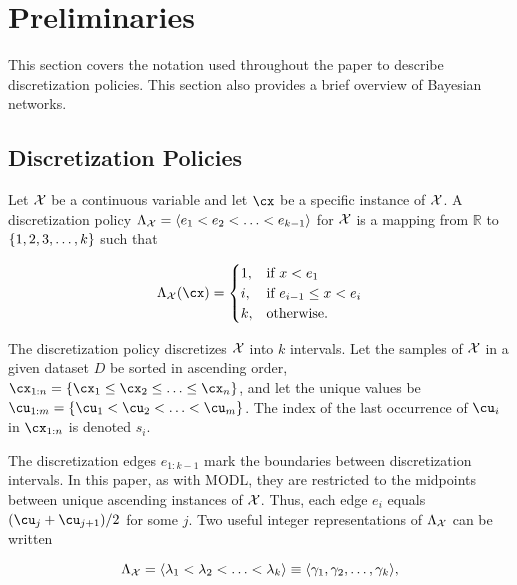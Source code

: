
\section{Preliminaries}
\label{sec:preliminaries}
This section covers the notation used throughout the paper to describe discretization policies.
This section also provides a brief overview of Bayesian networks.

\subsection{Discretization Policies}
\label{subsec:disc_policy}

Let $\mathcal{X}$ be a continuous variable and let $\cx$ be a specific instance of $\mathcal{X}$.
A discretization policy $\Lambda_{\mathcal{X}} = \langle e_1 < e_2 < \ldots < e_{k-1} \rangle$ for $\mathcal{X}$ is a mapping from $\mathbb{R}$ to $\curly{1,2,3,\ldots,k}$ such that

\begin{equation}
  \Lambda_{\cX}(\cx) = \begin{cases}
    1, & \text{if $x<e_1$}\\
    i, & \text{if $e_{i-1} \leq x < e_i$}\\
    k, & \text{otherwise.}
  \end{cases}
\end{equation}

\noindent
The discretization policy discretizes $\mathcal{X}$ into $k$ intervals.
Let the samples of $\mathcal{X}$ in a given dataset $D$ be sorted in ascending order, ${\cx_{1:n} = \curly{\cx_1 \leq \cx_2 \leq \ldots \leq \cx_n}}$, and let the unique values be ${\cu_{1:m} = \curly{\cu_1 < \cu_2 < \ldots < \cu_{m}}}$.
The index of the last occurrence of $\cu_i$ in $\cx_{1:n}$ is denoted $s_i$.

The discretization edges $e_{1:k-1}$ mark the boundaries between discretization intervals.
In this paper, as with MODL, they are restricted to the midpoints between unique ascending instances of $\mathcal{X}$.
Thus, each edge $e_i$ equals $\paren{\cu_{j} + \cu_{{j+1}}}/2$ for some $j$.
Two useful integer representations of $\Lambda_{\mathcal{X}}$ can be written

\begin{equation}
\label{eq:disc_def}
  \Lambda_{\mathcal{X}} = \langle \lambda_1 < \lambda_2  < \ldots < \lambda_k \rangle \equiv \langle \gamma_1, \gamma_2, \ldots, \gamma_k \rangle\text{,}
\end{equation}

